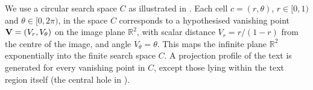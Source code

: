 We use a circular search space $C$ as illustrated in .
Each cell $c=(r,\theta)$, $r\in[0,1)$ and $\theta\in[0,2\pi)$, in the space $C$ corresponds to a hypothesised vanishing point ${ \bf V } = (V_r,V_{\theta})$
on the image plane $\mathbb{R}^2$, with
scalar distance $V_{r}=r/{(1-r)}$ from the centre of the image,
and angle $V_{\theta}=\theta$.
This maps the infinite plane $\mathbb{R}^2$ exponentially into the finite search space $C$.
A projection profile of the text is generated for
every vanishing point in $C$, except those lying within
the text region itself (the central hole in ).



\begin{comment}
The projection profile of a binary image with respect to a vanishing
point $\myvec{V}$ is obtained 
by collecting each pixel into a bin representing the angle between the
vanishing point and 
the pixel.  Relative to the vanishing point, the text region will fall
within a small 
range of angles, depending on the distance and position of the vanishing point.
In order to accumulate projection profiles which are comparable to each other, the angular
range over which each projection profile is taken is set accordingly.  In other words, the
left and right bins of the projection profile correspond to the left and right angles
within which the text region lies.  This ensures that the projection profile of a distant
vanishing point will not accumulate a tighter distribution, as would be the case if all
projection profiles were accumulated in the range $0-2\pi$.
*** !Kill above paragraph?  Keep next but make clearer! ***
*** !Alternative paragraph to the last!  Which do you prefer?!
\end{comment}

